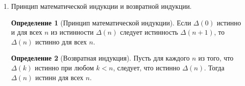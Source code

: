 \documentclass[a4paper]{article}
\theoremstyle{definition}
\newtheorem*{definition*}{Определение}
\newtheorem*{proposition*}{Предложение}
\begin{document}
\begin{enumerate}
       \begin{proposition*}[о представлении формул исчисления высказываний]
        Всякая неатомарная формула исчисления высказываний единственным образом представима в одном из следующих видов:
        \begin{itemize}
         \item $\lnot\Phi$;
         \item $(\Phi \land \Psi)$;
         \item $(\Phi \lor \Psi)$;
         \item $(\Phi \Rightarrow \Psi)$
        \end{itemize}
        Для некоторых $\Phi$ и $ \Psi$.
       \end{proposition*}
 \item Принцип математической индукции и возвратной индукции.
       \begin{definition*}[Принцип математической индукции]
        Если $\Delta(0)$ истинно и для всех $n$ из истинности $\Delta(n)$ следует истинность $\Delta(n + 1)$, то $\Delta(n)$ истинно для всех $n$.
       \end{definition*}

       \begin{definition*}[Возвратная индукция]
        Пусть для каждого $n$ из того, что $\Delta(k)$ истинно при любом $k < n$, следует, что истинно $\Delta(n)$. Тогда $\Delta(n)$ истинн для всех $n$.
       \end{definition*}


\end{enumerate}
\end{document}
